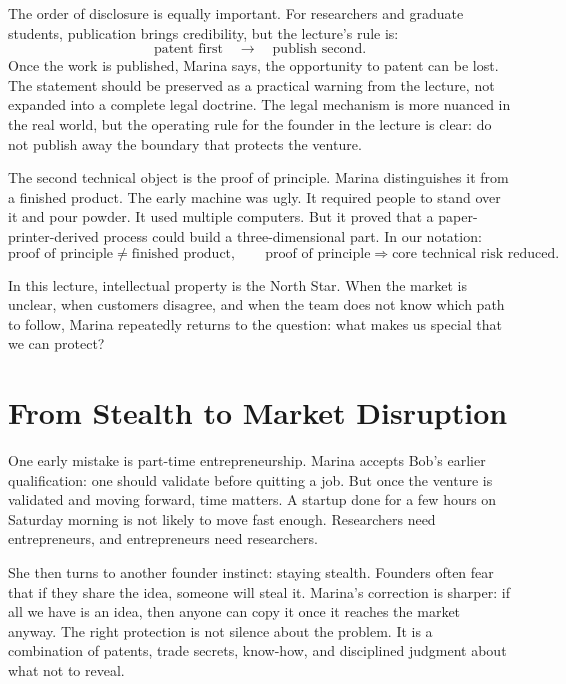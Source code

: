 The order of disclosure is equally important. For researchers and graduate students, publication brings credibility, but the lecture's rule is:
\begin{equation}
\text{patent first}\quad\longrightarrow\quad \text{publish second}.
\end{equation}
Once the work is published, Marina says, the opportunity to patent can be lost. The statement should be preserved as a practical warning from the lecture, not expanded into a complete legal doctrine. The legal mechanism is more nuanced in the real world, but the operating rule for the founder in the lecture is clear: do not publish away the boundary that protects the venture.

The second technical object is the proof of principle. Marina distinguishes it from a finished product. The early machine was ugly. It required people to stand over it and pour powder. It used multiple computers. But it proved that a paper-printer-derived process could build a three-dimensional part. In our notation:
\begin{equation}
\text{proof of principle}
\neq
\text{finished product},
\qquad
\text{proof of principle}\Rightarrow
\text{core technical risk reduced}.
\end{equation}

\begin{remark}
In this lecture, intellectual property is the North Star. When the market is unclear, when customers disagree, and when the team does not know which path to follow, Marina repeatedly returns to the question: what makes us special that we can protect?
\end{remark}

\section{From Stealth to Market Disruption}

One early mistake is part-time entrepreneurship. Marina accepts Bob's earlier qualification: one should validate before quitting a job. But once the venture is validated and moving forward, time matters. A startup done for a few hours on Saturday morning is not likely to move fast enough. Researchers need entrepreneurs, and entrepreneurs need researchers.

She then turns to another founder instinct: staying stealth. Founders often fear that if they share the idea, someone will steal it. Marina's correction is sharper: if all we have is an idea, then anyone can copy it once it reaches the market anyway. The right protection is not silence about the problem. It is a combination of patents, trade secrets, know-how, and disciplined judgment about what not to reveal.

